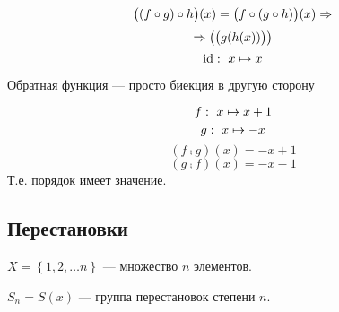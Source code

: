 \begin{note}
    \[\big( (f \circ g) \circ h \big)(x) = \big( f \circ (g \circ h) \big)(x) \Rightarrow\]
    \[\Rightarrow \bigl( \big(g(h(x))\big) \bigl)\]
    \[\mathrm{id} : \ x \mapsto x\]
\end{note}


Обратная функция --- просто биекция в другую сторону

\begin{example}
    \[f: \  x \mapsto x + 1\]
    \[g: \  x \mapsto -x\]
    \[(f \comp g)(x) = -x + 1\]
    \[(g \comp f)(x) = -x - 1\]
    Т.е. порядок имеет значение.
\end{example}

\newpage
\subsection{Перестановки}

\begin{definition}
    $X = \left \{1, 2, \dots n \right \}$ --- множество $n$ элементов.

    $S_n = S(x)$ --- группа перестановок степени $n$.
\end{definition}

